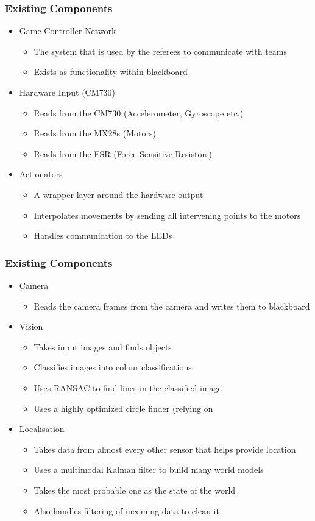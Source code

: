 \documentclass{beamer}
\begin{document}
\begin{frame}
	\frametitle{Existing Components}
	\begin{itemize}
		\item Game Controller Network
			\begin{itemize}
				\item The system that is used by the referees to communicate with teams
				\item Exists as functionality within blackboard
			\end{itemize}
		\item Hardware Input (CM730)
			\begin{itemize}
				\item Reads from the CM730 (Accelerometer, Gyroscope etc.)
				\item Reads from the MX28s (Motors)
				\item Reads from the FSR (Force Sensitive Resistors)
			\end{itemize}
		\item Actionators
			\begin{itemize}
				\item A wrapper layer around the hardware output
				\item Interpolates movements by sending all intervening points to the motors
				\item Handles communication to the LEDs
			\end{itemize}
	\end{itemize}
\end{frame}

\begin{frame}
	\frametitle{Existing Components}
	\begin{itemize}
		\item Camera
			\begin{itemize}
				\item Reads the camera frames from the camera and writes them to blackboard
			\end{itemize}
		\item Vision
			\begin{itemize}
				\item Takes input images and finds objects
				\item Classifies images into colour classifications
				\item Uses RANSAC to find lines in the classified image
				\item Uses a highly optimized circle finder (relying on 
			\end{itemize}
		\item Localisation
			\begin{itemize}
				\item Takes data from almost every other sensor that helps provide location
				\item Uses a multimodal Kalman filter to build many world models
				\item Takes the most probable one as the state of the world
				\item Also handles filtering of incoming data to clean it
			\end{itemize}
	\end{itemize}
\end{frame}
\end{document}

